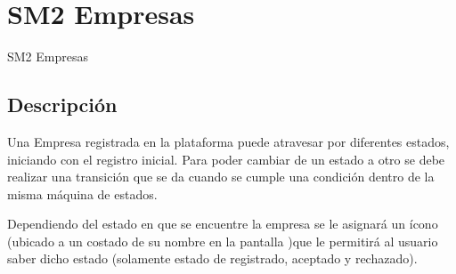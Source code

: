 \newpage

\section{SM2 Empresas}
\hypertarget{SM2 Empresas}{SM2 Empresas}

\subsection{Descripción}
    Una Empresa registrada en la plataforma puede atravesar por diferentes estados,
    iniciando con el registro inicial. Para poder cambiar de un estado a otro se debe realizar una transición que se da cuando se cumple una condición dentro de la misma máquina de estados.

   Dependiendo del estado en que se encuentre la empresa se le asignará un ícono (ubicado a un costado de su nombre en la pantalla )que le permitirá al usuario saber dicho estado (solamente estado de registrado, aceptado y rechazado). 
   
